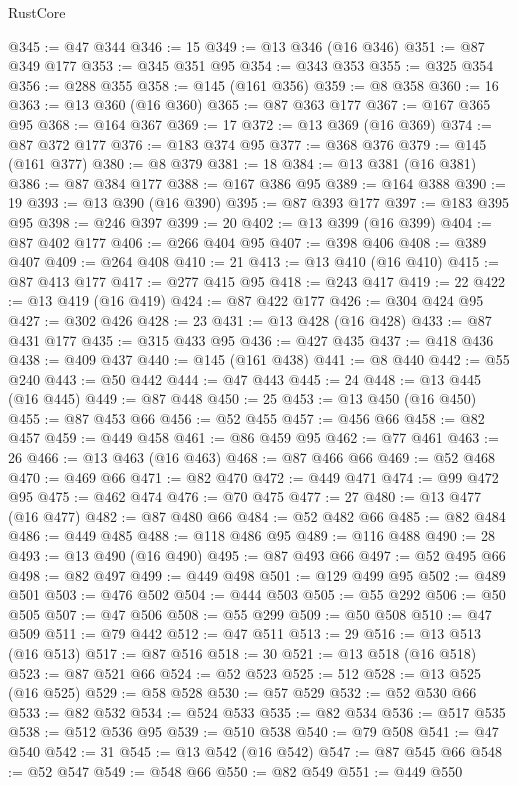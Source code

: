\begin{lexlean}{RustCore}
\begin{coremodule}
@345 := @47 @344
@346 := 15
@349 := @13 @346 (@16 @346)
@351 := @87 @349 @177
@353 := @345 @351 @95
@354 := @343 @353
@355 := @325 @354
@356 := @288 @355
@358 := @145 (@161 @356)
@359 := @8 @358
@360 := 16
@363 := @13 @360 (@16 @360)
@365 := @87 @363 @177
@367 := @167 @365 @95
@368 := @164 @367
@369 := 17
@372 := @13 @369 (@16 @369)
@374 := @87 @372 @177
@376 := @183 @374 @95
@377 := @368 @376
@379 := @145 (@161 @377)
@380 := @8 @379
@381 := 18
@384 := @13 @381 (@16 @381)
@386 := @87 @384 @177
@388 := @167 @386 @95
@389 := @164 @388
@390 := 19
@393 := @13 @390 (@16 @390)
@395 := @87 @393 @177
@397 := @183 @395 @95
@398 := @246 @397
@399 := 20
@402 := @13 @399 (@16 @399)
@404 := @87 @402 @177
@406 := @266 @404 @95
@407 := @398 @406
@408 := @389 @407
@409 := @264 @408
@410 := 21
@413 := @13 @410 (@16 @410)
@415 := @87 @413 @177
@417 := @277 @415 @95
@418 := @243 @417
@419 := 22
@422 := @13 @419 (@16 @419)
@424 := @87 @422 @177
@426 := @304 @424 @95
@427 := @302 @426
@428 := 23
@431 := @13 @428 (@16 @428)
@433 := @87 @431 @177
@435 := @315 @433 @95
@436 := @427 @435
@437 := @418 @436
@438 := @409 @437
@440 := @145 (@161 @438)
@441 := @8 @440
@442 := @55 @240
@443 := @50 @442
@444 := @47 @443
@445 := 24
@448 := @13 @445 (@16 @445)
@449 := @87 @448
@450 := 25
@453 := @13 @450 (@16 @450)
@455 := @87 @453 @66
@456 := @52 @455
@457 := @456 @66
@458 := @82 @457
@459 := @449 @458
@461 := @86 @459 @95
@462 := @77 @461
@463 := 26
@466 := @13 @463 (@16 @463)
@468 := @87 @466 @66
@469 := @52 @468
@470 := @469 @66
@471 := @82 @470
@472 := @449 @471
@474 := @99 @472 @95
@475 := @462 @474
@476 := @70 @475
@477 := 27
@480 := @13 @477 (@16 @477)
@482 := @87 @480 @66
@484 := @52 @482 @66
@485 := @82 @484
@486 := @449 @485
@488 := @118 @486 @95
@489 := @116 @488
@490 := 28
@493 := @13 @490 (@16 @490)
@495 := @87 @493 @66
@497 := @52 @495 @66
@498 := @82 @497
@499 := @449 @498
@501 := @129 @499 @95
@502 := @489 @501
@503 := @476 @502
@504 := @444 @503
@505 := @55 @292
@506 := @50 @505
@507 := @47 @506
@508 := @55 @299
@509 := @50 @508
@510 := @47 @509
@511 := @79 @442
@512 := @47 @511
@513 := 29
@516 := @13 @513 (@16 @513)
@517 := @87 @516
@518 := 30
@521 := @13 @518 (@16 @518)
@523 := @87 @521 @66
@524 := @52 @523
@525 := 512
@528 := @13 @525 (@16 @525)
@529 := @58 @528
@530 := @57 @529
@532 := @52 @530 @66
@533 := @82 @532
@534 := @524 @533
@535 := @82 @534
@536 := @517 @535
@538 := @512 @536 @95
@539 := @510 @538
@540 := @79 @508
@541 := @47 @540
@542 := 31
@545 := @13 @542 (@16 @542)
@547 := @87 @545 @66
@548 := @52 @547
@549 := @548 @66
@550 := @82 @549
@551 := @449 @550

\end{coremodule}
\end{lexlean}
